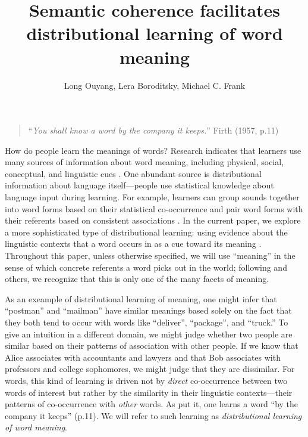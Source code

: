 \documentclass[man,floatsintext]{apa6}
\title{Semantic coherence facilitates distributional learning of word meaning}
\author{Long Ouyang, Lera Boroditsky, Michael C. Frank}
\affiliation{Department of Psychology, Stanford University}
\begin{document}
\maketitle

\begin{quote}
``\emph{You shall know a word by the company it keeps.}'' Firth (1957, p.11)
\end{quote}

How do people learn the meanings of words? Research indicates that learners use many sources of information about word meaning, including physical, social, conceptual, and linguistic cues \citep{clark1988,markman1991,gleitman1990,baldwin1993,hollich2000}. One abundant source is distributional information about language itself---people use statistical knowledge about language input during learning. For example, learners can group sounds together into word forms based on their statistical co-occurrence \citep{saffran1996a, saffran1996b} and pair word forms with their referents based on consistent associations \citep{yu2007,smith2008}. In the current paper, we explore a more sophisticated type of distributional learning: using evidence about the linguistic contexts that a word occurs in as a cue toward its meaning \citep{smith1966, maratsos1980,braine1987,redington1998}. Throughout this paper, unless otherwise specified, we will use ``meaning'' in the sense of which concrete referents a word picks out in the world; following \citet{wittgenstein1953} and others, we recognize that this is only one of the many facets of meaning.

As an exeample of distributional learning of meaning, one might infer that ``postman'' and ``mailman'' have similar meanings based solely on the fact that they both tend to occur with words like ``deliver'', ``package'', and ``truck.'' To give an intuition in a different domain, we might judge whether two people are  similar based on their patterns of association with other people. If we know that Alice associates with accountants and lawyers and that Bob associates with professors and college sophomores, we might judge that they are dissimilar. For words, this kind of learning is driven not by \emph{direct} co-occurrence between two words of interest but rather by the similarity in their linguistic contexts---their patterns of co-occurrence with \emph{other} words. As \citet{firth1957} put it, one learns a word ``by the company it keeps'' (p.11). We will refer to such learning as \emph{distributional learning of word meaning}.
\end{document}
